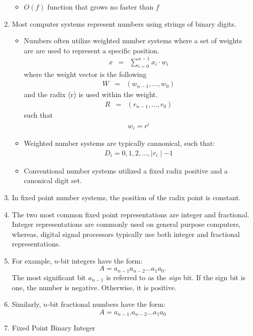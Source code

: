 \documentclass[times, twocolumn, 10pt]{article}
\begin{document}
\begin{enumerate}
\begin{itemize}
  \item $O(f)$ function that grows no faster than $f$
  \end{itemize}
\item Most computer systems represent numbers using strings of binary 
  digits. 
  \begin{itemize}
  \item Numbers often utilize weighted number systems where a set of
    weights are are used to represent a specific position.
    \begin{eqnarray*}
      x  & = & \sum_{i=0}^{n-1} x_i \cdot w_i
    \end{eqnarray*}
    where the weight vector is the following
    \begin{eqnarray*}
      W  & = & (w_{n-1}, \ldots, w_0)
    \end{eqnarray*}
    and the radix (r) is used within the weight.
    \begin{eqnarray*}
      R  & = & (r_{n-1}, \ldots, r_0)
    \end{eqnarray*}
    such that 
    \begin{eqnarray*}
      w_i = r ^ {i}
    \end{eqnarray*}
  \item Weighted number systems are typically cannonical, such that:
    \begin{eqnarray*}
      D_i = {0, 1, 2, \ldots, \mid r_i \mid - 1}
    \end{eqnarray*}
  \item Conventional number systems utilized a fixed radix positive
    and a canonical digit set.
  \end{itemize}
\item In fixed point number systems, the position of the radix point is
  constant. 
\item The two most common fixed point representations are integer
  and fractional. Integer representations are commonly used on 
  general purpose computers, whereas, digital signal processors
  typically use both integer and fractional representations. 
\item  For example, $n$-bit integers have the form:
  \[ A = a_{n-1} a_{n-2} \ldots a_{1} a_{0}. \]
  The most significant bit $a_{n-1}$ is referred to as 
  the {\it sign} bit. If the sign bit is one, the number 
  is negative. Otherwise, it is positive. 
\item Similarly, $n$-bit fractional numbers have the form:
  \[ A = a_{n-1}. a_{n-2} \ldots a_{1} a_{0} \]
\item Fixed Point Binary Integer

\end{enumerate}
\end{document}
